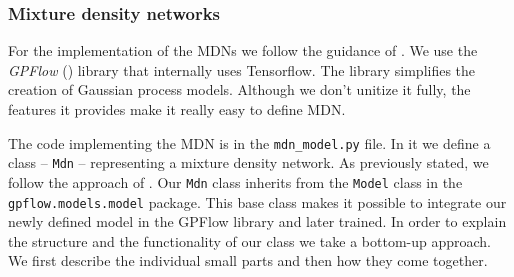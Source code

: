 \documentclass[12pt,a4paper,twoside]{scrartcl}
\numberwithin{equation}{section}
\begin{document}
\subsubsection{Mixture density networks}\label{sec:impl-mdn}
For the implementation of the MDNs we follow the guidance of \cite{mdntut}. We use the \emph{GPFlow} (\cite{gpflow}) library that internally uses Tensorflow. The library simplifies the creation of Gaussian process models. Although we don't unitize it fully, the features it provides make it really easy to define MDN.

The code implementing the MDN is in the \texttt{mdn\_model.py} file. In it we define a class -- \texttt{Mdn} -- representing a mixture density network. As previously stated, we follow the approach of \cite{mdntut}. Our \texttt{Mdn} class inherits from the \texttt{Model} class in the \texttt{gpflow.models.model} package. This base class makes it possible to integrate our newly defined model in the GPFlow library and later trained. In order to explain the structure and the functionality of our class we take a bottom-up approach. We first describe the individual small parts and then how they come together.
\end{document}
